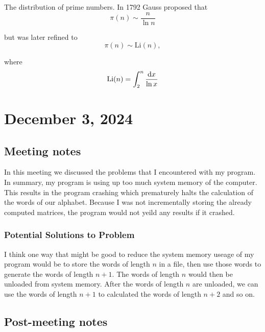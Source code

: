 \documentclass{amsart}
\begin{document}
\begin{example*}
	The distribution of prime numbers. In 1792 Gauss proposed that
	\begin{equation*}
		\pi(n) \sim \frac{n}{\ln n}
	\end{equation*}
	
	but was later refined to 
	\begin{equation*}
		\pi(n) \sim \text{Li}(n),
	\end{equation*}
	
	where
	\begin{equation*}
		\text{Li}(n) = \int_{2}^{n} \frac{\mathop{}\!\mathrm{d} x}{\ln x}
	\end{equation*}\cite{wolfram_prime_num_theorem}
\end{example*}


\section{December 3, 2024}
\subsection{Meeting notes}

\begin{summary}
	In this meeting we discussed the problems that I encountered with my program. In summary, my program is using up too much system memory of the computer. This results in the program crashing which prematurely halts the calculation of the words of our alphabet. Because I was not incrementally storing the already computed matrices, the program would not yeild any results if it crashed. 
\end{summary}



\subsubsection*{Potential Solutions to Problem}
I think one way that might be good to reduce the system memory useage of my program would be to store the words of length $n$ in a file, then use those words to generate the words of length $n + 1$. The words of length $n$ would then be unloaded from system memory. After the words of length $n$ are unloaded, we can use the words of length $n + 1$ to calculated the words of length $n + 2$ and so on. 

\subsection{Post-meeting notes}
\end{document}
